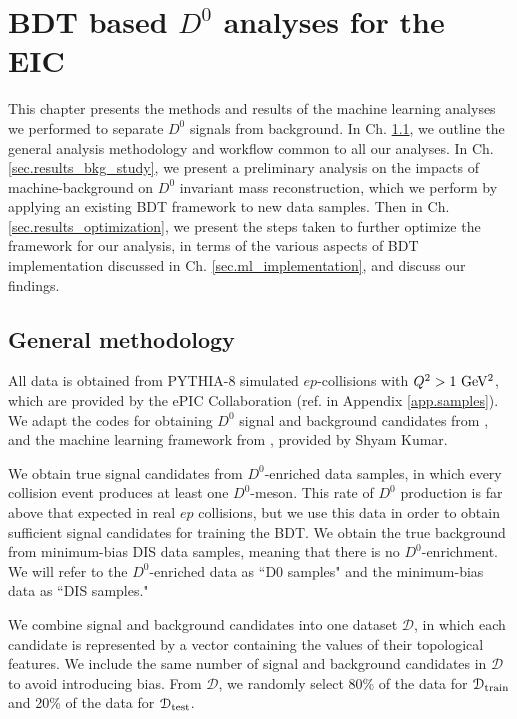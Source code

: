\chapter{BDT based $D^0$ analyses for the EIC}
\label{ch.results}

This chapter presents the methods and results of the machine learning analyses we performed to separate $D^0$ signals from background. In Ch. \ref{sec.results_gen_methods}, we outline the general analysis methodology and workflow common to all our analyses. In Ch. \ref{sec.results_bkg_study}, we present a preliminary analysis on the impacts of machine-background on $D^0$ invariant mass reconstruction, which we perform by applying an existing BDT framework to new data samples. Then in Ch. \ref{sec.results_optimization}, we present the steps taken to further optimize the framework for our analysis, in terms of the various aspects of BDT implementation discussed in Ch. \ref{sec.ml_implementation}, and discuss our findings.

\section{General methodology}
\label{sec.results_gen_methods}

All data is obtained from PYTHIA-8 simulated $ep$-collisions with $Q^2>1~{\rm GeV^2}$, which are provided by the ePIC Collaboration (ref. in Appendix \ref{app.samples}). We adapt the codes for obtaining $D^0$ signal and background candidates from \cite{Shyam_analysis}, and the machine learning framework from \cite{Shyam_ml}, provided by Shyam Kumar.

We obtain true signal candidates from $D^0$-enriched data samples, in which every collision event produces at least one $D^0$-meson. This rate of $D^0$ production is far above that expected in real $ep$ collisions, but we use this data in order to obtain sufficient signal candidates for training the BDT. We obtain the true background from minimum-bias DIS data samples, meaning that there is no $D^0$-enrichment. We will refer to the $D^0$-enriched data as ``D0 samples" and the minimum-bias data as ``DIS samples."

We combine signal and background candidates into one dataset $\mathcal{D}$, in which each candidate is represented by a vector containing the values of their topological features. We include the same number of signal and background candidates in $\mathcal{D}$ to avoid introducing bias. From $\mathcal{D}$, we randomly select 80\% of the data for $\mathcal{D}_{\rm train}$ and 20\% of the data for $\mathcal{D}_{\rm test}$.

